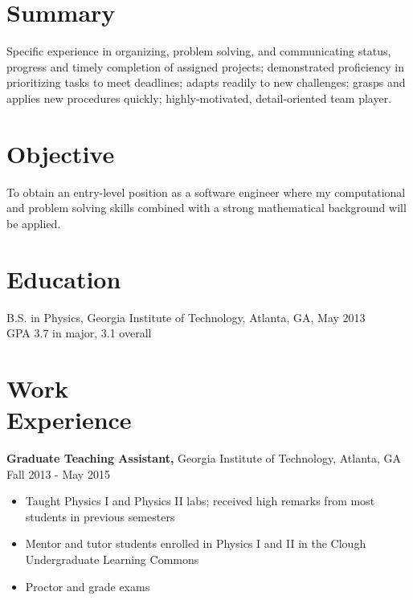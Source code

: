 \documentclass[margin]{res}
\begin{document}
 


\address{ Atlanta, GA \\
          jblythe29@gmail.com \\ (404)-788-3518 }

 
\begin{resume} 

\section{Summary}
Specific experience in organizing, problem solving, and communicating status, progress and timely
completion of assigned projects; demonstrated proficiency in prioritizing tasks to meet deadlines;
adapts readily to new challenges; grasps and applies new procedures quickly; highly-motivated,
detail-oriented team player.

\section{Objective} 
To obtain an entry-level position as a software engineer where my computational and
problem solving skills combined with a strong mathematical background will be applied.

\section{Education} 
B.S. in Physics, Georgia Institute of Technology, Atlanta, GA, May 2013 \\
GPA 3.7 in major, 3.1 overall

\section{Work \\Experience}
 {\bf Graduate Teaching Assistant,} Georgia Institute of Technology, Atlanta, GA \\  Fall 2013 - May 2015
 \begin{itemize} \itemsep -2pt  %
 \item Taught Physics I and Physics II labs; received high remarks from most students in previous semesters
 \item Mentor and tutor students enrolled in Physics I and II in the Clough Undergraduate Learning Commons
 \item Proctor and grade exams
 \end{itemize}


\end{resume}
\end{document}
